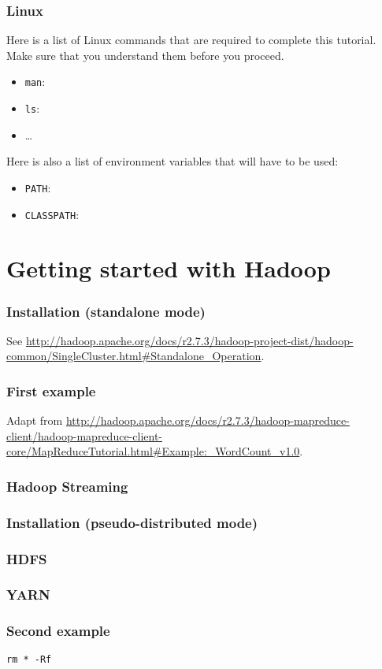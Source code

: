 \documentclass[a4,11pt]{article}
\begin{document}
\section{Linux}

Here is a list of Linux commands that are required to complete this
tutorial. Make sure that you understand them before you proceed.
\begin{itemize}
  \item \texttt{man}:
  \item \texttt{ls}:
  \item \ldots
\end{itemize}

Here is also a list of environment variables that will have to be
used:
\begin{itemize}
  \item \texttt{PATH}:
  \item \texttt{CLASSPATH}: 
\end{itemize}

\part{Getting started with Hadoop}

\section{Installation (standalone mode)}

See \url{http://hadoop.apache.org/docs/r2.7.3/hadoop-project-dist/hadoop-common/SingleCluster.html#Standalone_Operation}.

\section{First example}

Adapt from \url{http://hadoop.apache.org/docs/r2.7.3/hadoop-mapreduce-client/hadoop-mapreduce-client-core/MapReduceTutorial.html#Example:_WordCount_v1.0}.

\section{Hadoop Streaming}

\section{Installation (pseudo-distributed mode)}

\section{HDFS}

\section{YARN}

\section{Second example}


  \begin{sectionbox}{}
   \begin{verbatim}
rm * -Rf
   \end{verbatim}
  \end{sectionbox}
\end{document}
